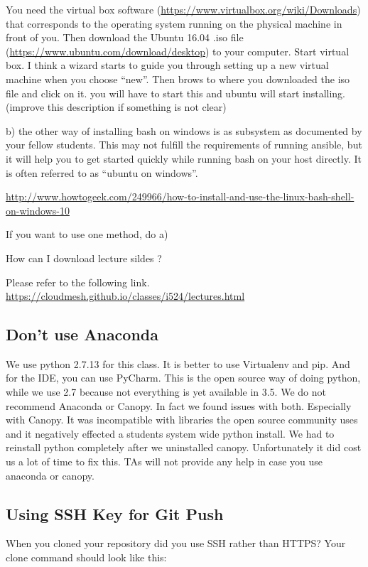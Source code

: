 You need the virtual box software
(\url{https://www.virtualbox.org/wiki/Downloads}) that corresponds to the
operating system running on the physical machine in front of you. Then
download the Ubuntu 16.04 .iso file
(\url{https://www.ubuntu.com/download/desktop}) to your computer. Start
virtual box. I think a wizard starts to guide you through setting up a
new virtual machine when you choose ``new''. Then brows to where you
downloaded the iso file and click on it. you will have to start this
and ubuntu will start installing. (improve this description if
something is not clear)

b) the other way of installing bash on windows is as subsystem as
documented by your fellow students. This may not fulfill the
requirements of running ansible, but it will help you to get started
quickly while running bash on your host directly. It is often referred
to as ``ubuntu on windows''.

\url{http://www.howtogeek.com/249966/how-to-install-and-use-the-linux-bash-shell-on-windows-10}

If you want to use one method, do a)

How can I download lecture sildes ?

Please refer to the following link.
\url{https://cloudmesh.github.io/classes/i524/lectures.html}


\subsection{Don't use Anaconda}
\label{\detokenize{faq:don-t-use-anaconda}}
We use python 2.7.13 for this class. It is better to use Virtualenv
and pip. And for the IDE, you can use PyCharm. This is the open source
way of doing python, while we use 2.7 because not everything is yet
available in 3.5. We do not recommend Anaconda or Canopy. In fact we
found issues with both. Especially with Canopy. It was incompatible
with libraries the open source community uses and it negatively
effected a students system wide python install. We had to reinstall
python completely after we uninstalled canopy. Unfortunately it did
cost us a lot of time to fix this. TAs will not provide any help in
case you use anaconda or canopy.


\subsection{Using SSH Key for Git Push}
\label{\detokenize{faq:using-ssh-key-for-git-push}}
When you cloned your repository did you use SSH rather than HTTPS?
Your clone command should look like this:

